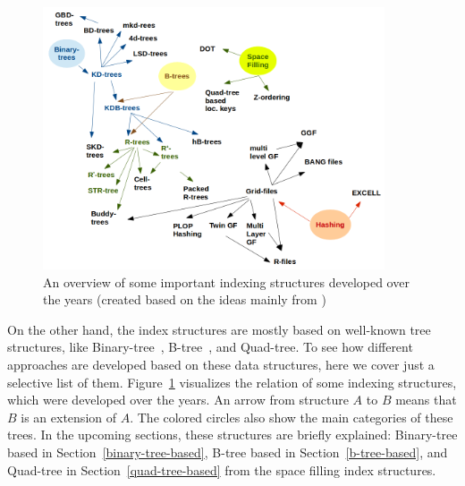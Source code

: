 \documentclass[a4paper,12pt]{article}
\begin{document}
\begin{figure}
\centering
\includegraphics[width=0.9\textwidth]{Trees}
\caption{An overview of some important indexing structures developed over the years 
(created based on the ideas mainly from \cite{survey})}
\label{trees}
\end{figure}

On the other hand, the index structures are mostly based on well-known tree structures, like Binary-tree~\cite{binarytree}, B-tree~\cite{btree}, and Quad-tree. 
To see how different approaches are developed based on these data structures, here we cover just a selective list of them. Figure~\ref{trees} visualizes the relation of some indexing structures, which were developed over the years. An arrow from structure $A$ to $B$ means that $B$ is an extension of $A$. The colored circles also show the main categories of these
trees. In the upcoming sections, these structures are briefly explained:
Binary-tree based in Section~\ref{binary-tree-based}, 
B-tree based in Section~\ref{b-tree-based}, 
and Quad-tree in Section~\ref{quad-tree-based} from the space filling index structures.
\end{document}
